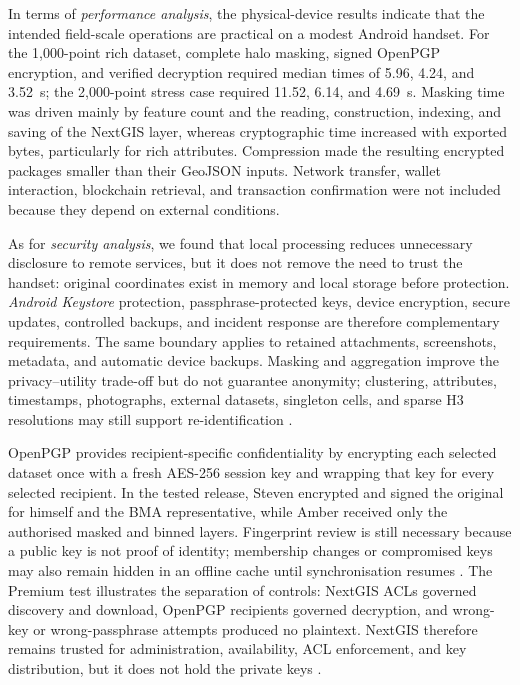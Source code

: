 \documentclass[]{interact}
\begin{document}
In terms of \textit{performance analysis}, the physical-device results indicate that the intended field-scale operations are practical on a modest Android handset. For the 1,000-point rich dataset, complete halo masking, signed OpenPGP encryption, and verified decryption required median times of 5.96, 4.24, and 3.52~s; the 2,000-point stress case required 11.52, 6.14, and 4.69~s. Masking time was driven mainly by feature count and the reading, construction, indexing, and saving of the NextGIS layer, whereas cryptographic time increased with exported bytes, particularly for rich attributes. Compression made the resulting encrypted packages smaller than their GeoJSON inputs. Network transfer, wallet interaction, blockchain retrieval, and transaction confirmation were not included because they depend on external conditions.

As for \textit{security analysis}, we found that local processing reduces unnecessary disclosure to remote services, but it does not remove the need to trust the handset: original coordinates exist in memory and local storage before protection. \textit{Android Keystore} protection, passphrase-protected keys, device encryption, secure updates, controlled backups, and incident response are therefore complementary requirements. The same boundary applies to retained attachments, screenshots, metadata, and automatic device backups. Masking and aggregation improve the privacy--utility trade-off but do not guarantee anonymity; clustering, attributes, timestamps, photographs, external datasets, singleton cells, and sparse H3 resolutions may still support re-identification \citep{kessler2018geoprivacy,zhang2022rehumanize,cassa2008re,zimmerman2008quantifying}.

OpenPGP provides recipient-specific confidentiality by encrypting each selected dataset once with a fresh AES-256 session key and wrapping that key for every selected recipient. In the tested release, Steven encrypted and signed the original for himself and the BMA representative, while Amber received only the authorised masked and binned layers. Fingerprint review is still necessary because a public key is not proof of identity; membership changes or compromised keys may also remain hidden in an offline cache until synchronisation resumes \citep{wouters2024openpgp}. The Premium test illustrates the separation of controls: NextGIS ACLs governed discovery and download, OpenPGP recipients governed decryption, and wrong-key or wrong-passphrase attempts produced no plaintext. NextGIS therefore remains trusted for administration, availability, ACL enforcement, and key distribution, but it does not hold the private keys \citep{nextgis2026permissions,wouters2024openpgp}.
\end{document}
